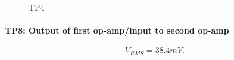 \documentclass[12pt]{article}
\begin{document}
        \begin{figure}[H]
          \centering
          \qquad
          \caption{TP4}
          \label{fig:tp4_waveforms}
        \end{figure}
        \setcounter{subfigure}{0}

      \newpage
      \paragraph{TP8: Output of first op-amp/input to second op-amp}

        \begin{equation}
          V_{RMS} = 38.4mV.\nonumber
        \end{equation}
\end{document}
